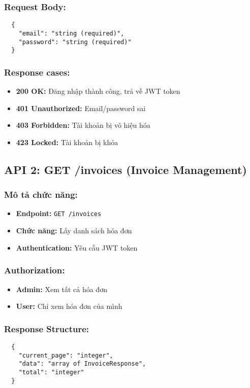 \documentclass[12pt,a4paper]{article}
\begin{document}
  \subsubsection{Request Body:}
  \begin{lstlisting}
  {
    "email": "string (required)",
    "password": "string (required)"
  }
  \end{lstlisting}

  \subsubsection{Response cases:}
  \begin{itemize}
  \item \textbf{200 OK:} Đăng nhập thành công, trả về JWT token
  \item \textbf{401 Unauthorized:} Email/password sai
  \item \textbf{403 Forbidden:} Tài khoản bị vô hiệu hóa
  \item \textbf{423 Locked:} Tài khoản bị khóa
  \end{itemize}

  \subsection{API 2: GET /invoices (Invoice Management)}

  \subsubsection{Mô tả chức năng:}
  \begin{itemize}
  \item \textbf{Endpoint:} \texttt{GET /invoices}
  \item \textbf{Chức năng:} Lấy danh sách hóa đơn
  \item \textbf{Authentication:} Yêu cầu JWT token
  \end{itemize}

  \subsubsection{Authorization:}
  \begin{itemize}
  \item \textbf{Admin:} Xem tất cả hóa đơn
  \item \textbf{User:} Chỉ xem hóa đơn của mình
  \end{itemize}

  \subsubsection{Response Structure:}
  \begin{lstlisting}
  {
    "current_page": "integer",
    "data": "array of InvoiceResponse",
    "total": "integer"
  }
  \end{lstlisting}
\end{document}
